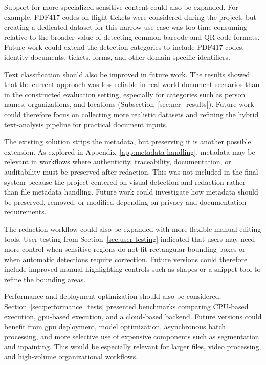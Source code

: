 Support for more specialized sensitive content could also be expanded. For example, PDF417 codes on flight tickets were considered during the project, but creating a dedicated dataset for this narrow use case was too time-consuming relative to the broader value of detecting common barcode and QR code formats. Future work could extend the detection categories to include PDF417 codes, identity documents, tickets, forms, and other domain-specific identifiers.

Text classification should also be improved in future work. The results showed that the current approach was less reliable in real-world document scenarios than in the constructed evaluation setting, especially for categories such as person names, organizations, and locations (Subsection~\ref{sec:ner_results}). Future work could therefore focus on collecting more realistic datasets and refining the hybrid text-analysis pipeline for practical document inputs.
 
The existing solution strips the metadata, but preserving it is another possible extension. As explored in Appendix~\ref{app:metadata-handling}, metadata may be relevant in workflows where authenticity, traceability, documentation, or auditability must be preserved after redaction. This was not included in the final system because the project centered on visual detection and redaction rather than file metadata handling. Future work could investigate how metadata should be preserved, removed, or modified depending on privacy and documentation requirements.

The redaction workflow could also be expanded with more flexible manual editing tools. User testing from Section~\ref{sec:user-testing} indicated that users may need more control when sensitive regions do not fit rectangular \gls{bounding box}es or when automatic detections require correction. Future versions could therefore include improved manual highlighting controls such as shapes or a snippet tool to refine the bounding areas.
 
Performance and deployment optimization should also be considered. Section~\ref{sec:performance_tests} presented benchmarks comparing CPU-based execution, \gls{gpu}-based execution, and a cloud-based backend. Future versions could benefit from \gls{gpu} deployment, model optimization, asynchronous batch processing, and more selective use of expensive components such as \gls{segmentation} and \gls{inpainting}. This would be especially relevant for larger files, video processing, and high-volume organizational workflows.

